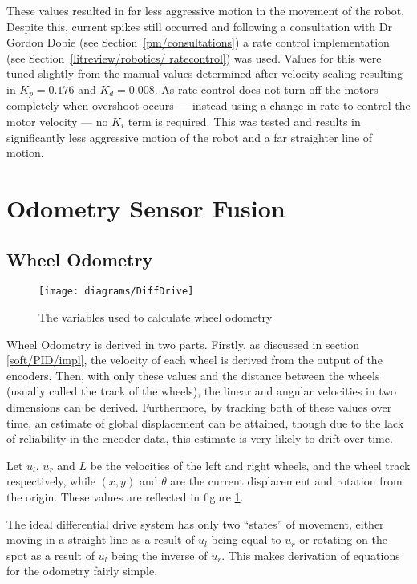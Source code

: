 These values resulted in far less aggressive motion in the movement of the 
robot. Despite this, current spikes still occurred and following a 
consultation with Dr Gordon Dobie (see Section~\ref{pm/consultations}) a 
rate control implementation (see Section~\ref{litreview/robotics/
ratecontrol}) was used. Values for this were tuned slightly from the 
manual values determined after velocity scaling resulting in $K_p = 0.176$ 
and $K_d = 0.008$. As rate control does not turn off the motors completely 
when overshoot occurs --- instead using a change in rate to control the 
motor velocity --- no $K_i$ term is required. This was tested and results 
in significantly less aggressive motion of the robot and a far straighter 
line of motion. 


\section{Odometry Sensor Fusion}\label{soft/odometry}

\subsection{Wheel Odometry}\label{soft/odometry/wheel}

\begin{figure}[!ht]
	\centering
	\texttt{[image: diagrams/DiffDrive]}
	\caption{The variables used to calculate wheel odometry}
	\label{fig:diff_drive_diagram}
\end{figure}

Wheel Odometry is derived in two parts. Firstly, as discussed in section
\ref{soft/PID/impl}, the velocity of each wheel is derived from the output of the
encoders. Then, with only these values and the distance between the wheels
(usually called the track of the wheels), the linear and angular velocities in two
dimensions can be derived. Furthermore, by tracking both of these values over
time, an estimate of global displacement can be attained, though due to the lack
of reliability in the encoder data, this estimate is very likely to drift over
time.

Let $u_l$, $u_r$ and $L$ be the velocities of the left and right wheels, and the
wheel track respectively, while $(x, y)$ and $\theta$ are the current displacement
and rotation from the origin. These values are reflected in figure \ref{fig:diff_drive_diagram}.

The ideal differential drive system has only two ``states'' of movement, either
moving in a straight line as a result of $u_l$ being equal to $u_r$ or rotating on
the spot as a result of $u_l$ being the inverse of $u_r$. This makes derivation of
equations for the odometry fairly simple. 

